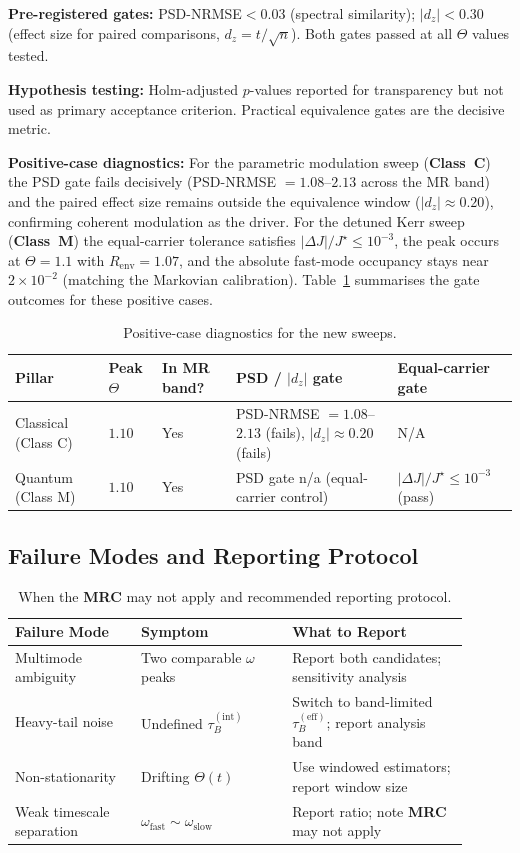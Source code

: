 \documentclass[11pt,letterpaper]{article}
\DeclareRobustCommand{\mrc}{\textbf{MRC}\xspace}
\DeclareRobustCommand{\classC}{\textbf{Class~C}\xspace}
\DeclareRobustCommand{\classM}{\textbf{Class~M}\xspace}
\begin{document}
\textbf{Pre-registered gates:} PSD-NRMSE$<0.03$ (spectral similarity); $|d_z|<0.30$ (effect size for paired comparisons, $d_z = t/\sqrt{n}$). Both gates passed at all $\Theta$ values tested.

\textbf{Hypothesis testing:} Holm-adjusted $p$-values reported for transparency but not used as primary acceptance criterion. Practical equivalence gates are the decisive metric.

\textbf{Positive-case diagnostics:} For the parametric modulation sweep (\classC{}) the PSD gate fails decisively (PSD-NRMSE $=1.08$--$2.13$ across the MR band) and the paired effect size remains outside the equivalence window ($|d_z|\approx0.20$), confirming coherent modulation as the driver. For the detuned Kerr sweep (\classM{}) the equal-carrier tolerance satisfies $|\Delta J|/J^\star\le 10^{-3}$, the peak occurs at $\Theta=1.1$ with $R_{\mathrm{env}}=1.07$, and the absolute fast-mode occupancy stays near $2\times10^{-2}$ (matching the Markovian calibration). Table~\ref{tab:positive_cases} summarises the gate outcomes for these positive cases.

\begin{table}[t]
\centering
\caption{Positive-case diagnostics for the new sweeps.}
\label{tab:positive_cases}
\begin{tabular}{@{}lllll@{}}
\toprule
Pillar & Peak $\Theta$ & In MR band? & PSD / $|d_z|$ gate & Equal-carrier gate \\
\midrule
Classical (Class C) & $1.10$ & Yes & PSD-NRMSE $=1.08$--$2.13$ (fails), $|d_z|\approx0.20$ (fails) & N/A \\
Quantum (Class M) & $1.10$ & Yes & PSD gate n/a (equal-carrier control) & $|\Delta J|/J^\star\le 10^{-3}$ (pass) \\
\bottomrule
\end{tabular}
\end{table}

\subsection*{Failure Modes and Reporting Protocol}

\begin{table}[h!]
\centering
\caption{When the \mrc may not apply and recommended reporting protocol.}
\label{tab:failures}
\begin{tabular}{@{}p{0.25\linewidth}p{0.30\linewidth}p{0.35\linewidth}@{}}
\toprule
Failure Mode & Symptom & What to Report \\
\midrule
Multimode ambiguity & Two comparable $\omega$ peaks & Report both candidates; sensitivity analysis \\
Heavy-tail noise & Undefined $\tau_B^{(\mathrm{int})}$ & Switch to band-limited $\tau_B^{(\mathrm{eff})}$; report analysis band \\
Non-stationarity & Drifting $\Theta(t)$ & Use windowed estimators; report window size \\
Weak timescale separation & $\omega_{\mathrm{fast}}\sim\omega_{\mathrm{slow}}$ & Report ratio; note \mrc may not apply \\
\bottomrule
\end{tabular}
\end{table}

\FloatBarrier


\end{document}
